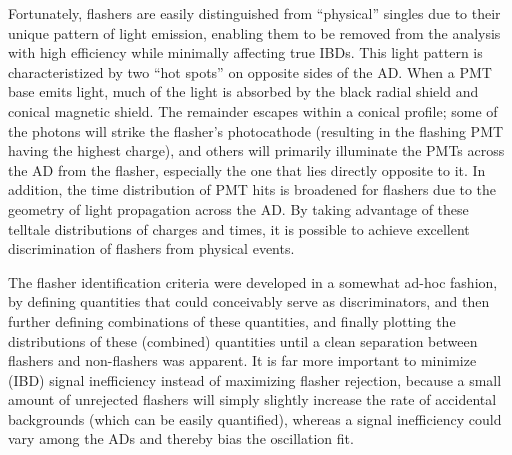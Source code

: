 \documentclass[../thesis.tex]{subfiles}
\begin{document}
Fortunately, flashers are easily distinguished from ``physical'' singles due to their unique pattern of light emission, enabling them to be removed from the analysis with high efficiency while minimally affecting true IBDs. This light pattern is characteristized by two ``hot spots'' on opposite sides of the AD. When a PMT base emits light, much of the light is absorbed by the black radial shield and conical magnetic shield. The remainder escapes within a conical profile; some of the photons will strike the flasher's photocathode (resulting in the flashing PMT having the highest charge), and others will primarily illuminate the PMTs across the AD from the flasher, especially the one that lies directly opposite to it. In addition, the time distribution of PMT hits is broadened for flashers due to the geometry of light propagation across the AD. By taking advantage of these telltale distributions of charges and times, it is possible to achieve excellent discrimination of flashers from physical events.

The flasher identification criteria were developed in a somewhat ad-hoc fashion, by defining quantities that could conceivably serve as discriminators, and then further defining combinations of these quantities, and finally plotting the distributions of these (combined) quantities until a clean separation between flashers and non-flashers was apparent. It is far more important to minimize (IBD) signal inefficiency instead of maximizing flasher rejection, because a small amount of unrejected flashers will simply slightly increase the rate of accidental backgrounds (which can be easily quantified), whereas a signal inefficiency could vary among the ADs and thereby bias the oscillation fit.

\newcommand\fmax{f_{\mathrm{max}}}
\newcommand\fquad{f_{\mathrm{quad}}}
\newcommand\fID{f_{\mathrm{ID}}}
\newcommand\fPSD{f_{\mathrm{PSD}}}
\end{document}
